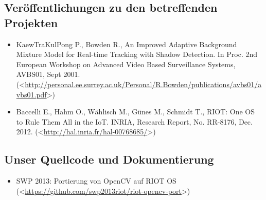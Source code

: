 \documentclass[10pt,a4paper]{article}
\begin{document}
\subsection*{Veröffentlichungen zu den betreffenden Projekten} 
\begin{itemize}

\item KaewTraKulPong P., Bowden R., An Improved Adaptive Background Mixture Model for Real-time Tracking with Shadow Detection. In Proc. 2nd European Workshop on Advanced Video Based Surveillance Systems, AVBS01, Sept 2001. \newline (\textless\href{http://personal.ee.surrey.ac.uk/Personal/R.Bowden/publications/avbs01/avbs01.pdf}{http://personal.ee.surrey.ac.uk/Personal/R.Bowden/publications/avbs01/avbs01.pdf}\textgreater)

\item Baccelli E., Hahm O., Wählisch M., Günes M., Schmidt T., RIOT: One OS to Rule Them All in the IoT. INRIA, Research Report, No. RR-8176, Dec. 2012. \newline (\textless\href{http://hal.inria.fr/hal-00768685/}{http://hal.inria.fr/hal-00768685/}\textgreater)

\end{itemize}

\subsection*{Unser Quellcode und Dokumentierung}
\begin{itemize}
\item SWP 2013: Portierung von OpenCV auf RIOT OS \newline (\textless\href{https://github.com/swp2013riot/riot-opencv-port}{https://github.com/swp2013riot/riot-opencv-port}\textgreater)

\end{itemize}
\end{document}
